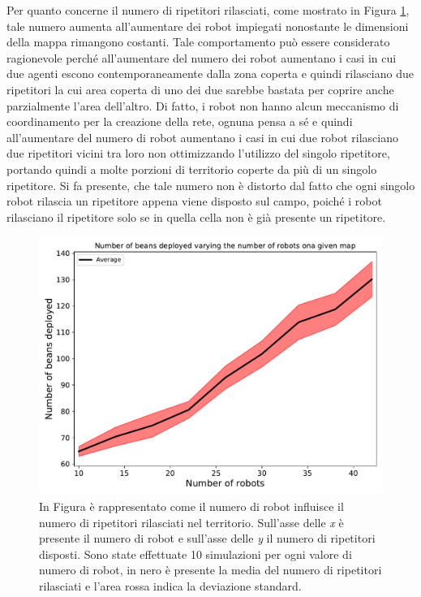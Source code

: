 Per quanto concerne il numero di ripetitori rilasciati, come mostrato in Figura \ref{fig:robotsbeans}, tale numero aumenta all'aumentare dei robot impiegati nonostante le dimensioni della mappa rimangono costanti.
Tale comportamento può essere considerato ragionevole perché all'aumentare del numero dei robot aumentano i casi in cui due agenti escono contemporaneamente dalla zona coperta e quindi rilasciano due ripetitori la cui area coperta di uno dei due sarebbe bastata per coprire anche parzialmente l'area dell'altro.
Di fatto, i robot non hanno alcun meccanismo di coordinamento per la creazione della rete, ognuna pensa a sé e quindi all'aumentare del numero di robot aumentano i casi in cui due robot rilasciano due ripetitori vicini tra loro non ottimizzando l'utilizzo del singolo ripetitore, portando quindi a molte porzioni di territorio coperte da più di un singolo ripetitore.
Si fa presente, che tale numero non è distorto dal fatto che ogni singolo robot rilascia un ripetitore appena viene disposto sul campo, poiché i robot rilasciano il ripetitore solo se in quella cella non è già presente un ripetitore.
\begin{figure}
	\centering
	\includegraphics[width=0.9\linewidth]{images/macro_results/robots_beans}
	\caption{In Figura è rappresentato come il numero di robot influisce il numero di ripetitori rilasciati nel territorio. Sull'asse delle \textit{x} è presente il numero di robot e sull'asse delle \textit{y} il numero di ripetitori disposti. Sono state effettuate 10 simulazioni per ogni valore di numero di robot, in nero è presente la media del numero di ripetitori rilasciati e l'area rossa indica la deviazione standard.}
	\label{fig:robotsbeans}
\end{figure}

